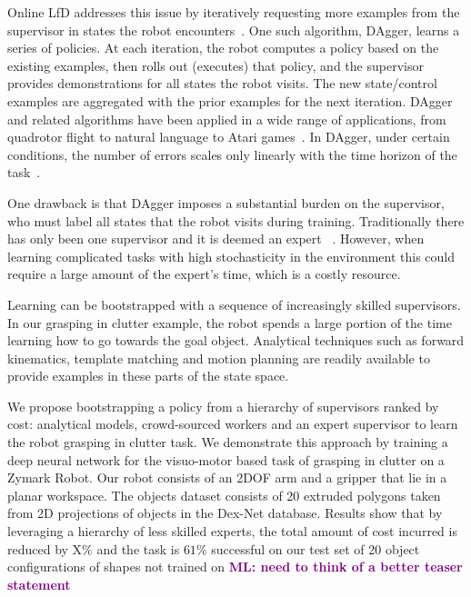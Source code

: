 \documentclass[10pt, conference]{ieeeconf}      %
\newcommand{\mlnote}[1]{\ifthenelse{ \boolean{include-notes}}%
 {\textcolor{purple}{\textbf{ML: #1}}}{}}
\begin{document}
Online LfD addresses this issue by iteratively requesting more examples from the supervisor in states the robot encounters~\cite{grollman2007dogged,ross2010efficient,ross2010reduction}. One such algorithm, DAgger, learns a series of policies. At each iteration, the robot computes a policy based on the existing examples, then rolls out (executes) that policy, and the supervisor provides demonstrations for all states the robot visits. The new state/control examples are aggregated with the prior examples for the next iteration. DAgger and related algorithms have been applied in a wide range of applications, from quadrotor flight to natural language to Atari games~\cite{NIPS2014_5421,duvallet2013imitation,ross2013learning}. In DAgger, under certain conditions, the number of errors scales only linearly with the time horizon of the task~\cite{ross2010reduction}.


One drawback is that DAgger imposes a substantial burden on the supervisor, who must label all states that the robot visits during training.  Traditionally there has only been one supervisor and it is deemed an expert ~\cite{ross2010efficient,ross2010reduction,ross2013learning,duvallet2013imitation}. However, when learning complicated tasks with high stochasticity in the environment this could require a large amount of the expert's time, which is a costly resource. 

Learning can be bootstrapped with a sequence of increasingly skilled supervisors. In our grasping in clutter example, the robot spends a large portion of the time learning how to go towards the goal object. Analytical techniques such as forward kinematics, template matching and motion planning are readily available to provide examples in these parts of the state space. 

We propose bootstrapping a policy from a hierarchy of supervisors ranked by cost: analytical models, crowd-sourced workers and an expert supervisor to learn the robot grasping in clutter task. We demonstrate this approach by training a deep neural network for the visuo-motor based task of  grasping in clutter on a Zymark Robot. Our robot consists of an 2DOF arm and a gripper that lie in a planar workspace. The objects dataset consists of 20  extruded polygons taken from 2D projections of objects in the Dex-Net \cite{mahler2016dexnet} database.  Results show that by leveraging a hierarchy of less skilled experts, the total amount of cost incurred is reduced by X$\%$ and the task is $61\%$ successful on our test set of 20 object configurations of shapes not trained on \mlnote{need to think of a better teaser statement}
\end{document}
